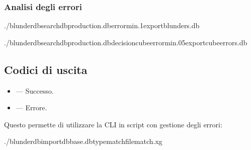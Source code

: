 \documentclass[letterpaper,10pt,italian]{sphinxmanual}
\begin{document}
\subsubsection{Analisi degli errori}
\label{\detokenize{cli:analyse-des-erreurs}}
\begin{sphinxVerbatim}[commandchars=\\\{\}]
./blunderdbsearch\PYGZhy{}\PYGZhy{}dbproduction.db\PYGZhy{}\PYGZhy{}error\PYGZhy{}min.1\PYGZhy{}\PYGZhy{}exportblunders.db

./blunderdbsearch\PYGZhy{}\PYGZhy{}dbproduction.db\PYGZhy{}\PYGZhy{}decisioncube\PYGZhy{}\PYGZhy{}error\PYGZhy{}min.05\PYGZhy{}\PYGZhy{}exportcube\PYGZus{}errors.db
\end{sphinxVerbatim}


\subsection{Codici di uscita}
\label{\detokenize{cli:codes-de-retour}}\begin{itemize}
\item {} 
\sphinxAtStartPar
{} — Successo.

\item {} 
\sphinxAtStartPar
{} — Errore.

\end{itemize}

\sphinxAtStartPar
Questo permette di utilizzare la CLI in script con gestione degli errori:

\begin{sphinxVerbatim}[commandchars=\\\{\}]
./blunderdbimport\PYGZhy{}\PYGZhy{}dbbase.db\PYGZhy{}\PYGZhy{}typematch\PYGZhy{}\PYGZhy{}filematch.xg
\end{sphinxVerbatim}
\end{document}
